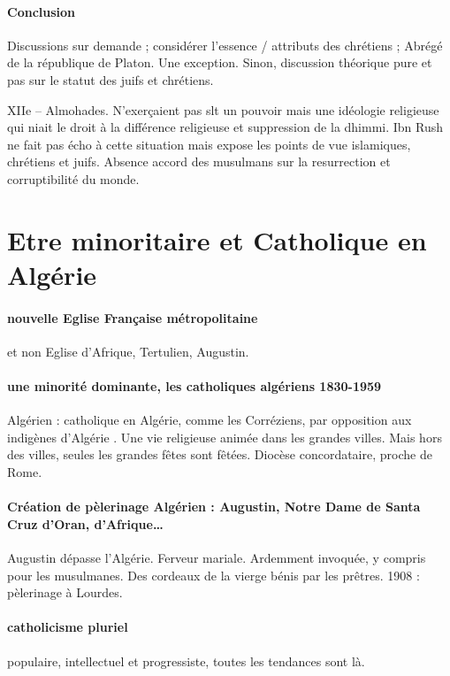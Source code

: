 \paragraph{Conclusion} Discussions sur demande ; considérer l’essence / attributs des chrétiens ; 
Abrégé de la république de Platon. Une exception. Sinon, discussion théorique pure et pas sur le statut des juifs et chrétiens. 

 
\begin{Synthesis}
XIIe – Almohades. N’exerçaient pas slt un pouvoir mais une idéologie religieuse qui niait le droit à la différence religieuse et suppression de la dhimmi.
Ibn Rush ne fait pas écho à cette situation mais expose les points de vue islamiques, chrétiens et juifs.
Absence accord des musulmans sur la resurrection et corruptibilité du monde. 
\end{Synthesis}
\section{Etre minoritaire et Catholique en Algérie}
\paragraph{nouvelle Eglise Française métropolitaine} et non Eglise d’Afrique, Tertulien, Augustin. 
\paragraph{une minorité dominante, les catholiques algériens 1830-1959} Algérien : catholique en Algérie, comme les Corréziens, par opposition aux indigènes d’Algérie . 
Une vie religieuse animée dans les grandes villes. Mais hors des villes, seules les grandes fêtes sont fêtées. Diocèse concordataire, proche de Rome. 

\paragraph{Création de pèlerinage Algérien : Augustin, Notre Dame de Santa Cruz d’Oran, d’Afrique…} Augustin dépasse l’Algérie. Ferveur mariale. Ardemment invoquée, y compris pour les musulmanes. Des cordeaux de la vierge bénis par les prêtres. 1908 : pèlerinage à Lourdes. 
\paragraph{catholicisme pluriel} populaire, intellectuel et progressiste, toutes les tendances sont là. 

